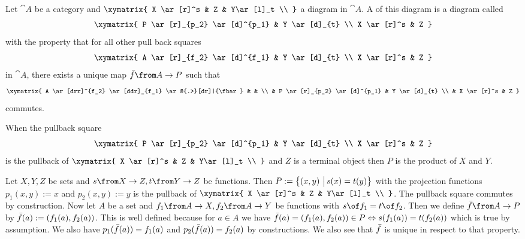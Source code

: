 \begin{definition}[Pullback]
  \label{def:pullback}
  Let $\cat{A}$ be a category and
  $ \xymatrix{
    X \ar[r]^s & Z & Y\ar[l]_t \\
  } $
  a diagram in $\cat{A}$.
  A  of this diagram is a diagram called 
  \[ \xymatrix{
    P \ar[r]_{p_2} \ar[d]^{p_1} & Y \ar[d]_{t} \\
    X \ar[r]^s & Z
  } \]
  with the property that for all other pull back squares
  \[ \xymatrix{
    A \ar[r]_{f_2} \ar[d]^{f_1} & Y \ar[d]_{t} \\
    X \ar[r]^s & Z
  } \]
  in $\cat{A}$, there exists a unique map $\fbar\from A \to P$ such that
  \[ \xymatrix{
    A \ar[drr]^{f_2} \ar[ddr]_{f_1} \ar@{.>}[dr]|{\fbar} & & \\
    & P \ar[r]_{p_2} \ar[d]^{p_1} & Y \ar[d]_{t} \\
    & X \ar[r]^s & Z
  } \]
  commutes.
\end{definition}

\begin{example}
  \label{ex:pullback:product}
  When the pullback square
  \[ \xymatrix{
    P \ar[r]_{p_2} \ar[d]^{p_1} & Y \ar[d]_{t} \\
    X \ar[r]^s & Z
  } \]
  is the pullback of
  $ \xymatrix{
    X \ar[r]^s & Z & Y\ar[l]_t \\
  } $
  and $Z$ is a terminal object then $P$ is the product of $X$ and $Y$.
\end{example}

\begin{example}
  \label{ex:pullback:set}
  Let $X, Y, Z$ be sets and $s \from X \to Z, t \from Y \to Z$ be functions.
  Then $P := \bigl \{ \left( x , y \right) \,\big|\, s(x) = t(y) \bigr \}$ with the projection functions
  $p_1(x,y) := x$ and $p_2(x, y) := y$ is the pullback of
  $ \xymatrix{
    X \ar[r]^s & Z & Y\ar[l]_t \\
  } $.
  The pullback square commutes by construction.
  Now let $A$ be a set and $f_1 \from A \to X, f_2 \from A \to Y$ be functions with $s \of f_1 = t \of f_2$.
  Then we define $\fbar \from A \to P$ by
  $\bar{f}(a) := \left( f_1(a) , f_2(a) \right)$.
  This is well defined because for $a \in A$ we have $\bar{f}(a) = \left( f_1(a) , f_2(a) \right) \in P \Leftrightarrow s(f_1(a)) = t(f_2(a))$ which is true by assumption.
  We also have $p_1(\bar{f}(a)) = f_1(a)$ and $p_2(\bar{f}(a)) = f_2(a)$ by constructions.
  We also see that $\bar{f}$ is unique in respect to that property.
\end{example}

